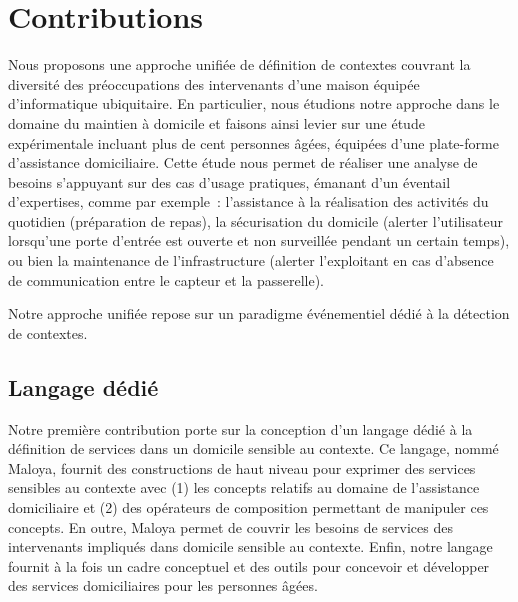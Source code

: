 
\section{Contributions}
Nous proposons une approche unifiée de définition de contextes couvrant la 
diversité des préoccupations des intervenants d’une maison équipée 
d’informatique ubiquitaire. En particulier, nous étudions notre approche dans le 
domaine du maintien à domicile et faisons ainsi levier sur une étude 
expérimentale incluant plus de cent personnes âgées, équipées d’une plate-forme 
d’assistance domiciliaire. Cette étude nous permet de réaliser une analyse de 
besoins s’appuyant sur des cas d’usage pratiques, émanant d’un éventail 
d’expertises, comme par exemple~: l'assistance à la réalisation des activités du quotidien 
(\eg préparation de repas), la sécurisation du domicile (\eg alerter l'utilisateur 
lorsqu'une porte d'entrée est ouverte et non surveillée pendant un certain temps), ou bien la
maintenance de l'infrastructure (\eg alerter l'exploitant en cas d'absence de communication entre le capteur 
et la passerelle). 

Notre approche unifiée repose sur un paradigme événementiel dédié à la détection de contextes.  %

\subsection{Langage dédié}
Notre première contribution porte sur 
la conception d'un langage dédié à la définition de services dans un domicile sensible au contexte. Ce langage, nommé Maloya, fournit des constructions de haut niveau pour exprimer des services sensibles au contexte avec (1) les concepts relatifs au domaine de l'assistance domiciliaire et (2) des opérateurs de composition permettant de manipuler ces concepts. En outre, Maloya permet de couvrir les besoins de services des intervenants impliqués dans domicile sensible au contexte. Enfin, notre langage fournit à la fois un cadre conceptuel et des outils pour concevoir et développer des services domiciliaires pour les personnes âgées.

